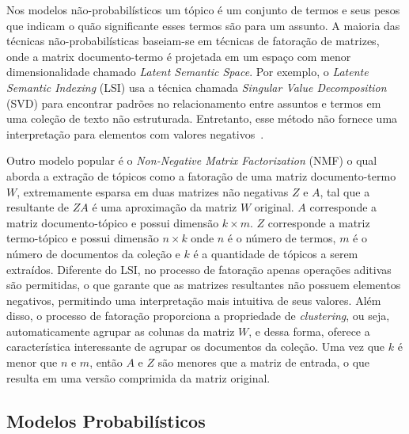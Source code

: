 Nos modelos não-probabilísticos um tópico é um conjunto de termos e seus pesos que indicam o quão significante esses termos são para um assunto. A maioria das técnicas não-probabilísticas baseiam-se em técnicas de fatoração de matrizes, onde a matrix documento-termo é projetada em um espaço com menor dimensionalidade chamado \textit{Latent Semantic Space}. Por exemplo, o \textit{Latente Semantic Indexing} (LSI) usa a técnica chamada \textit{Singular Value Decomposition} (SVD) para encontrar padrões no relacionamento entre assuntos e termos em uma coleção de texto não estruturada. Entretanto, esse método não fornece uma interpretação para elementos com valores negativos~\cite{Cheng2013}. %

Outro modelo popular é o \textit{Non-Negative Matrix Factorization} (NMF) o qual aborda a extração de tópicos como a fatoração de uma matriz documento-termo $W$, extremamente esparsa em duas matrizes não negativas $Z$ e $A$, tal que a resultante de $ZA$ é uma aproximação da matriz $W$ original.  $A$ corresponde a matriz documento-tópico e possui dimensão $k \times m$. $Z$ corresponde a matriz termo-tópico e possui dimensão $n \times k$ onde $n$ é o número de termos, $m$ é o número de documentos da coleção e $k$ é a quantidade de tópicos a serem extraídos.  Diferente do LSI, no processo de fatoração apenas operações aditivas são permitidas, o que garante que as matrizes resultantes não possuem elementos negativos, permitindo uma interpretação mais intuitiva de seus valores. Além disso, o processo de fatoração proporciona a propriedade de \textit{clustering}, ou seja, automaticamente agrupar as colunas da matriz $W$, e dessa forma, oferece a característica interessante de agrupar os documentos da coleção. Uma vez que $k$ é menor que $n$ e $m$, então $A$ e $Z$ são menores que a matriz de entrada, o que resulta em uma versão comprimida da matriz original.





\subsection{Modelos Probabilísticos}

